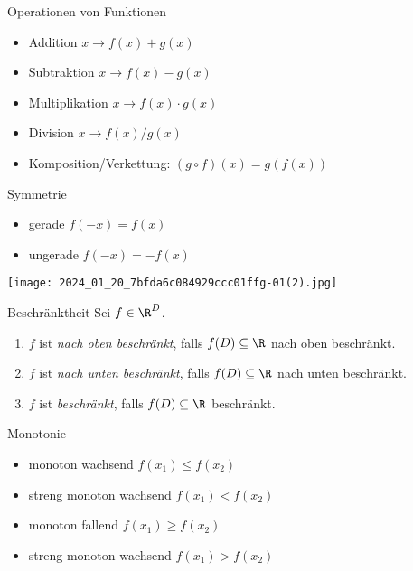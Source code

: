\begin{theorem}{Operationen von Funktionen}
  \begin{itemize}
    \item Addition $x \rightarrow f(x)+g(x)$
    \item Subtraktion $x \rightarrow f(x)-g(x)$
    \item Multiplikation $x \rightarrow f(x) \cdot g(x)$
    \item Division $x \rightarrow f(x) / g(x)$
    \item Komposition/Verkettung: $(g \circ f)(x)=g(f(x))$
  \end{itemize}
\end{theorem}

\begin{definition}{Symmetrie}
  \begin{itemize}
    \item gerade $f(-x)=f(x)$
    \item ungerade $f(-x)=-f(x)$
  \end{itemize}
\end{definition}

\begin{center}
    \texttt{[image: 2024\_01\_20\_7bfda6c084929ccc01ffg-01(2).jpg]}
\end{center}

\begin{definition}{Beschränktheit}
    Sei $f \in \R^D$.
    \begin{enumerate}
        \item $f$ ist \emph{nach oben beschränkt}, falls $f(D) \subseteq \R$ nach oben beschränkt.
        \item $f$ ist \emph{nach unten beschränkt}, falls $f(D) \subseteq \R$ nach unten beschränkt.
        \item $f$ ist \emph{beschränkt}, falls $f(D) \subseteq \R$ beschränkt.
    \end{enumerate}
\end{definition}

\begin{definition}{Monotonie}
    \begin{itemize}
  \item monoton wachsend $f\left(x_{1}\right) \leq f\left(x_{2}\right)$
  \item streng monoton wachsend $f\left(x_{1}\right)<f\left(x_{2}\right)$
  \item monoton fallend $f\left(x_{1}\right) \geq f\left(x_{2}\right)$
  \item streng monoton wachsend $f\left(x_{1}\right)>f\left(x_{2}\right)$
\end{itemize}
\end{definition}


